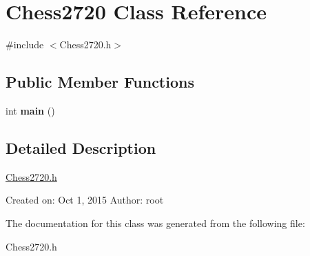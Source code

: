 \hypertarget{classChess2720}{}\section{Chess2720 Class Reference}
\label{classChess2720}


{\ttfamily \#include $<$Chess2720.\+h$>$}

\subsection*{Public Member Functions}
\begin{DoxyCompactItemize}
\item 
\hypertarget{classChess2720_a8c8732303f01d9fa4bef9922f74e0636}{}int {\bfseries main} ()\label{classChess2720_a8c8732303f01d9fa4bef9922f74e0636}

\end{DoxyCompactItemize}


\subsection{Detailed Description}
\hyperlink{Chess2720_8h_source}{Chess2720.\+h}

Created on\+: Oct 1, 2015 Author\+: root 

The documentation for this class was generated from the following file\+:\begin{DoxyCompactItemize}
\item 
Chess2720.\+h\end{DoxyCompactItemize}
